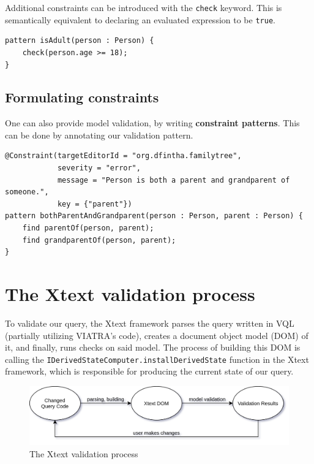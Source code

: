 \documentclass[11pt,a4paper,oneside]{report}
\begin{document}
Additional constraints can be introduced with the \texttt{check} keyword. This
is semantically equivalent to declaring an evaluated expression to be
\texttt{true}.

\begin{lstlisting}[caption={A simple constraint, checking if a \texttt{Person} is an adult}, frame=single]
pattern isAdult(person : Person) {
    check(person.age >= 18);
}
\end{lstlisting}

\subsection{Formulating constraints}
One can also provide model validation, by writing \textbf{constraint patterns}.
This can be done by annotating our validation pattern.

\begin{lstlisting}[caption={Validation constraint, emitting an error message if two \texttt{Person} entities have both parent-child and grandparent-grandchild relations}, frame=single]
@Constraint(targetEditorId = "org.dfintha.familytree",
            severity = "error",
            message = "Person is both a parent and grandparent of someone.",
            key = {"parent"})
pattern bothParentAndGrandparent(person : Person, parent : Person) {
    find parentOf(person, parent);
    find grandparentOf(person, parent);
}
\end{lstlisting}

\section{The Xtext validation process}
To validate our query, the Xtext framework parses the query written in VQL
(partially utilizing VIATRA's code), creates a document object model (DOM) of
it, and finally, runs checks on said model. The process of building this DOM is
calling the \texttt{IDerivedStateComputer.installDerivedState} function in the
Xtext framework, which is responsible for producing the current state of our
query.

\begin{figure}[ht]
\centering
\includegraphics[width=150mm, keepaspectratio]{figures/xtext-validation-process.png}
\caption{The Xtext validation process}
\label{fig:xtext-validation-process}
\end{figure}
\end{document}
